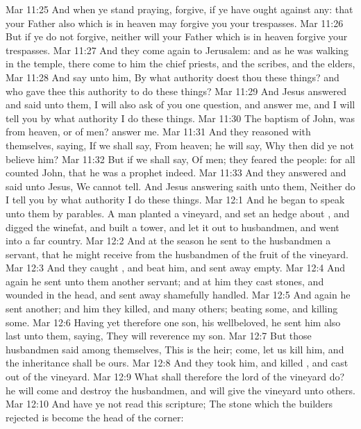 \vs Mar 11:25 And when ye stand praying, forgive, if ye have ought against any: that your Father also which is in heaven may forgive you your trespasses.
\vs Mar 11:26 But if ye do not forgive, neither will your Father which is in heaven forgive your trespasses.
\vs Mar 11:27 And they come again to Jerusalem: and as he was walking in the temple, there come to him the chief priests, and the scribes, and the elders,
\vs Mar 11:28 And say unto him, By what authority doest thou these things? and who gave thee this authority to do these things?
\vs Mar 11:29 And Jesus answered and said unto them, I will also ask of you one question, and answer me, and I will tell you by what authority I do these things.
\vs Mar 11:30 The baptism of John, was  from heaven, or of men? answer me.
\vs Mar 11:31 And they reasoned with themselves, saying, If we shall say, From heaven; he will say, Why then did ye not believe him?
\vs Mar 11:32 But if we shall say, Of men; they feared the people: for all  counted John, that he was a prophet indeed.
\vs Mar 11:33 And they answered and said unto Jesus, We cannot tell. And Jesus answering saith unto them, Neither do I tell you by what authority I do these things.
\vs Mar 12:1 And he began to speak unto them by parables. A  man planted a vineyard, and set an hedge about , and digged  the winefat, and built a tower, and let it out to husbandmen, and went into a far country.
\vs Mar 12:2 And at the season he sent to the husbandmen a servant, that he might receive from the husbandmen of the fruit of the vineyard.
\vs Mar 12:3 And they caught , and beat him, and sent  away empty.
\vs Mar 12:4 And again he sent unto them another servant; and at him they cast stones, and wounded  in the head, and sent  away shamefully handled.
\vs Mar 12:5 And again he sent another; and him they killed, and many others; beating some, and killing some.
\vs Mar 12:6 Having yet therefore one son, his wellbeloved, he sent him also last unto them, saying, They will reverence my son.
\vs Mar 12:7 But those husbandmen said among themselves, This is the heir; come, let us kill him, and the inheritance shall be ours.
\vs Mar 12:8 And they took him, and killed , and cast  out of the vineyard.
\vs Mar 12:9 What shall therefore the lord of the vineyard do? he will come and destroy the husbandmen, and will give the vineyard unto others.
\vs Mar 12:10 And have ye not read this scripture; The stone which the builders rejected is become the head of the corner:
